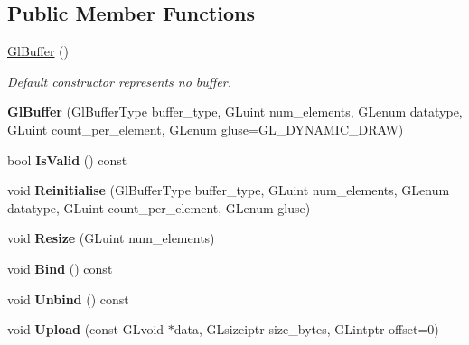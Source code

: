 \subsection*{Public Member Functions}
\begin{DoxyCompactItemize}
\item 
\hyperlink{structpangolin_1_1_gl_buffer_a79a7e18ccfd8fc65b92d12729e387190}{Gl\+Buffer} ()\hypertarget{structpangolin_1_1_gl_buffer_a79a7e18ccfd8fc65b92d12729e387190}{}\label{structpangolin_1_1_gl_buffer_a79a7e18ccfd8fc65b92d12729e387190}

\begin{DoxyCompactList}\small\item\em Default constructor represents \textquotesingle{}no buffer\textquotesingle{}. \end{DoxyCompactList}\item 
{\bfseries Gl\+Buffer} (Gl\+Buffer\+Type buffer\+\_\+type, G\+Luint num\+\_\+elements, G\+Lenum datatype, G\+Luint count\+\_\+per\+\_\+element, G\+Lenum gluse=G\+L\+\_\+\+D\+Y\+N\+A\+M\+I\+C\+\_\+\+D\+R\+AW)\hypertarget{structpangolin_1_1_gl_buffer_a4d7733b41cc4aa26af87c9d9b2302438}{}\label{structpangolin_1_1_gl_buffer_a4d7733b41cc4aa26af87c9d9b2302438}

\item 
bool {\bfseries Is\+Valid} () const \hypertarget{structpangolin_1_1_gl_buffer_a5a5f4090406297c55ec7db7427927824}{}\label{structpangolin_1_1_gl_buffer_a5a5f4090406297c55ec7db7427927824}

\item 
void {\bfseries Reinitialise} (Gl\+Buffer\+Type buffer\+\_\+type, G\+Luint num\+\_\+elements, G\+Lenum datatype, G\+Luint count\+\_\+per\+\_\+element, G\+Lenum gluse)\hypertarget{structpangolin_1_1_gl_buffer_a9d2b5477723741351b611225a59f096d}{}\label{structpangolin_1_1_gl_buffer_a9d2b5477723741351b611225a59f096d}

\item 
void {\bfseries Resize} (G\+Luint num\+\_\+elements)\hypertarget{structpangolin_1_1_gl_buffer_aed1fa9ab25b4ade2e4c5dbd19e7f1dde}{}\label{structpangolin_1_1_gl_buffer_aed1fa9ab25b4ade2e4c5dbd19e7f1dde}

\item 
void {\bfseries Bind} () const \hypertarget{structpangolin_1_1_gl_buffer_aa2daa9a7a43e70ffbab240299bec5b08}{}\label{structpangolin_1_1_gl_buffer_aa2daa9a7a43e70ffbab240299bec5b08}

\item 
void {\bfseries Unbind} () const \hypertarget{structpangolin_1_1_gl_buffer_ad4a2d1ceb35fd1b319b0d288af6f2466}{}\label{structpangolin_1_1_gl_buffer_ad4a2d1ceb35fd1b319b0d288af6f2466}

\item 
void {\bfseries Upload} (const G\+Lvoid $\ast$data, G\+Lsizeiptr size\+\_\+bytes, G\+Lintptr offset=0)\hypertarget{structpangolin_1_1_gl_buffer_a4bb774712e15e148c4e721e1466f3144}{}\label{structpangolin_1_1_gl_buffer_a4bb774712e15e148c4e721e1466f3144}

\end{DoxyCompactItemize}
